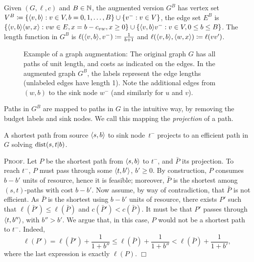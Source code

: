 \documentclass[opre,nonblindrev]{informs3} %
\renewenvironment{proof}[1][\textsc{Proof.}]{#1 }{\hfill $\Box$}
\begin{document}
\begin{definition}
Given $(G,\ell,c)$ and $B\in\N$, the augmented version $G^B$ has vertex set $V^B \defeq\crl*{\pp{v,b}: v\in V, b=0,1,\ldots,B}\cup\crl*{v^-:v\in V}$, the edge set $E^B$ is\\ $\crl*{\pp{v,b}\pp{w,x} : vw\in E, x=b-c_{vw}, x\geq 0}\cup\crl*{\pp{v,b}v^-: v\in V, 0\leq b\leq B}$.
The length function in $G^B$ is $\ell(\pp{v,b},v^-) \defeq \frac{1}{b+1}$ and $\ell(\pp{v,b},\pp{w,x}) \defeq \ell(vv')$.
\end{definition}

\begin{figure}

\caption{Example of a graph augmentation: The original graph $G$ has all paths of unit length, and costs as indicated on the edges. In the augmented graph $G^B$, the labels represent the edge lengths (unlabeled edges have length 1). Note the additional edges from $(w,b)$ to the sink node $w^-$ (and similarly for $u$ and $v$). 
}
\label{fig:augmented}
\end{figure}

Paths in $G^B$ are mapped to paths in $G$ in the intuitive way, by removing the budget labels and sink nodes.
We call this mapping the \emph{projection} of a path.


\begin{proposition}\label{prop:shorteffic}
A shortest path from source $\pp{s,b}$ to sink node~$t^-$ projects to an efficient path in $G$ solving $\dist(s,t|b)$. 
\end{proposition}
\begin{proof}
Let $P$ be the shortest path from $\pp{s,b}$ to $t^-$, and $\bar P$ its projection.
To reach $t^-$, $P$ must pass through some $\pp{t,b'}$, $b'\geq 0$.
By construction, $P$ consumes $b-b'$ units of resource, hence it is feasible; moreover, $\bar P$ is the shortest among $(s,t)$-paths with cost $b-b'$.
Now assume, by way of contradiction, that $\bar P$ is not efficient.
As $\bar P$ is the shortest using $b-b'$ units of resource, there exists $P'$ such that $\ell(\bar P')\leq \ell(\bar P)$ and $c(\bar P')< c(\bar P)$.
It must be that $P'$ passes through $\pp{t,b''}$, with $b''>b'$.
We argue that, in this case, $P$ would not be a shortest path to $t^-$.
Indeed, 
\[
\ell(P')=\ell(\bar P')+\frac{1}{1+b''}
\leq \ell(\bar P) +\frac{1}{1+b''}
< \ell(\bar P) +\frac{1}{1+b'},
\]
where the last expression is exactly $\ell(P)$.
\end{proof}
\end{document}
